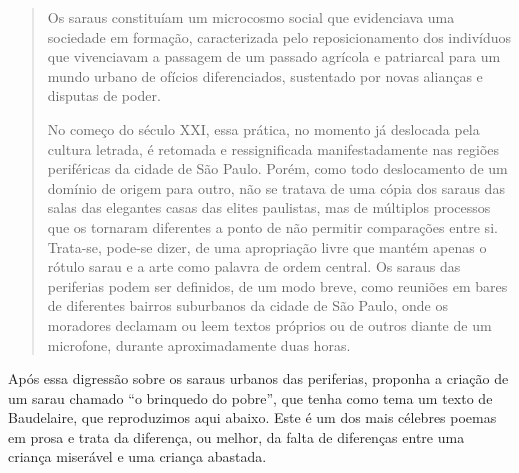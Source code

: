 \documentclass[12pt]{extarticle}
\begin{document}
\begin{quote}
Os saraus constituíam um microcosmo social que evidenciava uma
sociedade em formação, caracterizada pelo reposicionamento dos indivíduos 
que vivenciavam a passagem de um passado agrícola e patriarcal
para um mundo urbano de ofícios diferenciados, sustentado por novas
alianças e disputas de poder.

No começo do século XXI, essa prática, no momento já deslocada pela
cultura letrada, é retomada e ressignificada manifestadamente nas regiões
periféricas da cidade de São Paulo. Porém, como todo deslocamento de
um domínio de origem para outro, não se tratava de uma cópia dos saraus
das salas das elegantes casas das elites paulistas, mas de múltiplos 
processos que os tornaram diferentes a ponto de não permitir comparações entre
si. Trata-se, pode-se dizer, de uma apropriação livre que mantém apenas o
rótulo sarau e a arte como palavra de ordem central.
Os saraus das periferias podem ser definidos, de um modo breve,
como reuniões em bares de diferentes bairros suburbanos da cidade de
São Paulo, onde os moradores declamam ou leem textos próprios ou de outros 
diante de um microfone, durante aproximadamente duas horas. 
\end{quote}

Após essa digressão sobre os saraus urbanos das periferias, proponha
a criação de um sarau chamado ``o brinquedo do pobre'', que tenha como tema um texto de Baudelaire,
que reproduzimos aqui abaixo. Este é um 
dos mais célebres poemas em prosa e trata da diferença, ou melhor, da 
falta de diferenças entre
uma criança miserável e uma criança abastada.
\end{document}
